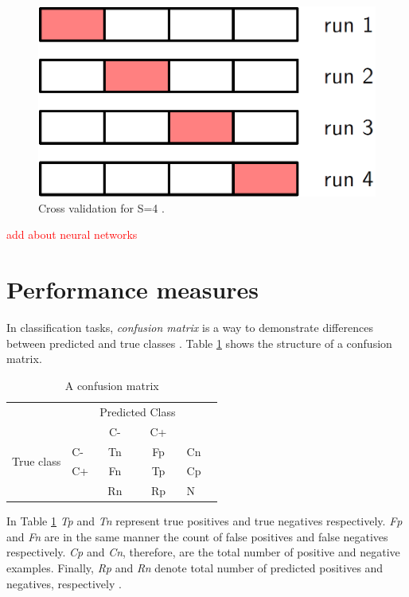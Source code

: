 \begin{figure}
    \includegraphics[width=0.5\linewidth ]{figures/crossv.png}
    \centering
    \caption{Cross validation for S=4 \cite{bishop2006pattern}.}
    \label{fig:crossv}
\end{figure}

\textcolor{red}{add about neural networks}\\

\section{Performance measures}
In classification tasks, \textit{confusion matrix} is a way to demonstrate differences between predicted and true classes \cite{Bradley1997}. Table \ref{tab:conf-mat} shows the structure of a confusion matrix.
\begin{table}[]
    \centering
    \begin{tabular}{llccll}
                                &    & \multicolumn{2}{l}{Predicted Class} &    &  \\ \cline{3-4}
                                &    & C-               & C+               &    &  \\ \hline
    \multirow{2}{*}{True class} & C- & Tn               & Fp               & Cn &  \\
                                & C+ & Fn               & Tp               & Cp &  \\
                                &    & Rn               & Rp               & N  &  \\ \hline
    \end{tabular}
    \caption{A confusion matrix}
    \label{tab:conf-mat}
\end{table}

In Table \ref{tab:conf-mat} \textit{Tp} and \textit{Tn} represent true positives and true negatives respectively. \textit{Fp} and \textit{Fn} are in the same manner the count of false positives and false negatives respectively. \textit{Cp} and \textit{Cn}, therefore, are the total number of positive and negative examples. Finally, \textit{Rp} and \textit{Rn} denote total number of predicted positives and negatives, respectively \cite{Bradley1997}.

